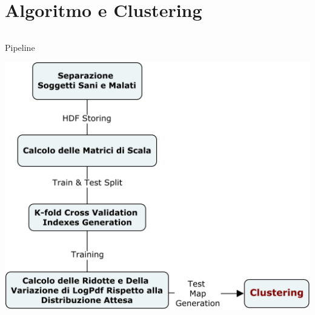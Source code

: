 \documentclass{beamer}
\begin{document}
\section{Algoritmo e Clustering}


\begin{frame}
\begin {columns}
\begin{column}{0.8\linewidth}
\begin{block} {Pipeline}

\includegraphics[scale=0.2]{ADNI-alg}


\end{block}


\end{column}
\end{columns}
\end{frame}
\end{document}
